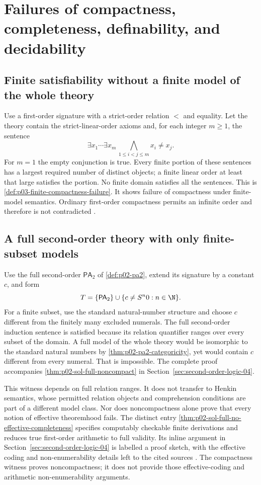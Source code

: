 \section{Failures of compactness, completeness, definability, and decidability}
\label{sec:p14-counter-metatheory}

\subsection{Finite satisfiability without a finite model of the whole theory}
\label{sec:p14-counter-finite-compactness}

Use a first-order signature with a strict-order relation \(<\) and equality.
Let the theory contain the strict-linear-order axioms and, for each integer
\(m\geq1\), the sentence
\[
 \exists x_1\cdots\exists x_m\,
                  \bigwedge_{1\leq i<j\leq m}x_i\ne x_j.
\]
For \(m=1\) the empty conjunction is true. Every finite portion of these
sentences has a largest required number of distinct objects; a finite
linear order at least that large satisfies the portion. No finite domain
satisfies all the sentences. This is
\cref{def:p03-finite-compactness-failure}. It shows failure of compactness
under finite-model semantics. Ordinary first-order compactness permits an
infinite order and therefore is not contradicted
\cite{Libkin2004,EbbinghausFlum1995}.

\subsection{A full second-order theory with only finite-subset models}
\label{sec:p14-counter-second-order-compactness}

Use the full second-order \(\mathsf{PA}_2\) of \cref{def:p02-pa2},
extend its signature by a constant \(c\), and form
\[
 T=\{\mathsf{PA}_2\}\cup\{c\ne S^n0:n\in\N\}.
\]
For a finite subset, use the standard natural-number structure and choose
\(c\) different from the finitely many excluded numerals. The full
second-order induction sentence is satisfied because its relation quantifier
ranges over every subset of the domain. A full model of the whole theory
would be isomorphic to the standard natural numbers by
\cref{thm:p02-pa2-categoricity}, yet would contain \(c\) different from
every numeral. That is impossible. The complete proof accompanies
\cref{thm:p02-sol-full-noncompact} in
Section~\ref{sec:second-order-logic-04}.

This witness depends on full relation ranges. It does not transfer to Henkin
semantics, whose permitted relation objects and comprehension conditions are
part of a different model class. Nor does noncompactness alone prove that
every notion of effective theoremhood fails. The distinct entry
\cref{thm:p02-sol-full-no-effective-completeness} specifies computably
checkable finite derivations and reduces true first-order arithmetic to full
validity. Its inline argument in Section~\ref{sec:second-order-logic-04}
is labelled a proof sketch, with the
effective coding and non-enumerability details left to the cited sources
\cite{BarwiseFeferman1985,Shapiro1991}. The compactness witness proves
noncompactness; it does not provide those effective-coding and arithmetic
non-enumerability arguments.

